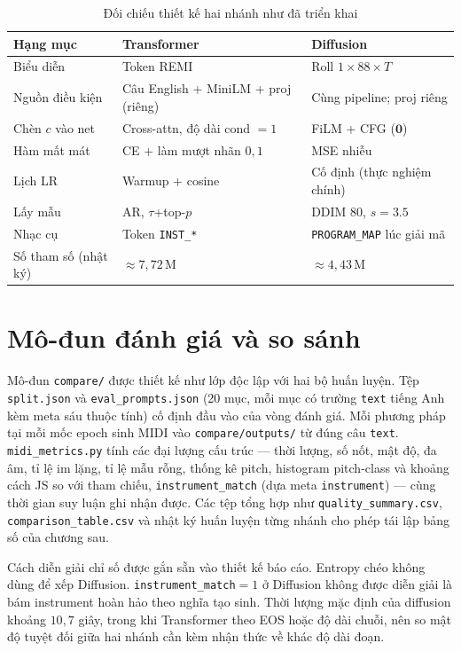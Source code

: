 \begin{table}[htbp]
\centering
\caption{Đối chiếu thiết kế hai nhánh như đã triển khai}
\label{tab:ch3-design}
\small
\begin{tabular}{p{2.8cm}p{5.5cm}p{5.5cm}}
\toprule
\textbf{Hạng mục} & \textbf{Transformer} & \textbf{Diffusion} \\
\midrule
Biểu diễn & Token REMI & Roll $1\times 88\times T$ \\
Nguồn điều kiện & Câu English + MiniLM + proj (riêng) & Cùng pipeline; proj riêng \\
Chèn $c$ vào net & Cross-attn, độ dài cond $=1$ & FiLM + CFG ($\mathbf{0}$) \\
Hàm mất mát & CE + làm mượt nhãn $0{,}1$ & MSE nhiễu \\
Lịch LR & Warmup + cosine & Cố định (thực nghiệm chính) \\
Lấy mẫu & AR, $\tau$+top-$p$ & DDIM 80, $s{=}3.5$ \\
Nhạc cụ & Token \texttt{INST\_*} & \texttt{PROGRAM\_MAP} lúc giải mã \\
Số tham số (nhật ký) & $\approx 7{,}72$\,M & $\approx 4{,}43$\,M \\
\bottomrule
\end{tabular}
\end{table}

\section{Mô-đun đánh giá và so sánh}
\label{sec:ch3-eval}

Mô-đun \texttt{compare/} được thiết kế như lớp độc lập với hai bộ huấn luyện. Tệp \texttt{split.json} và \texttt{eval\_prompts.json} (20 mục, mỗi mục có trường \texttt{text} tiếng Anh kèm meta sáu thuộc tính) cố định đầu vào của vòng đánh giá. Mỗi phương pháp tại mỗi mốc epoch sinh MIDI vào \texttt{compare/outputs/} từ đúng câu \texttt{text}. \texttt{midi\_metrics.py} tính các đại lượng cấu trúc --- thời lượng, số nốt, mật độ, đa âm, tỉ lệ im lặng, tỉ lệ mẫu rỗng, thống kê pitch, histogram pitch-class và khoảng cách JS so với tham chiếu, \texttt{instrument\_match} (dựa meta \texttt{instrument}) --- cùng thời gian suy luận ghi nhận được. Các tệp tổng hợp như \texttt{quality\_summary.csv}, \texttt{comparison\_table.csv} và nhật ký huấn luyện từng nhánh cho phép tái lập bảng số của chương sau.

Cách diễn giải chỉ số được gắn sẵn vào thiết kế báo cáo. Entropy chéo không dùng để xếp Diffusion. \texttt{instrument\_match}${}=1$ ở Diffusion không được diễn giải là bám instrument hoàn hảo theo nghĩa tạo sinh. Thời lượng mặc định của diffusion khoảng $10{,}7$ giây, trong khi Transformer theo EOS hoặc độ dài chuỗi, nên so mật độ tuyệt đối giữa hai nhánh cần kèm nhận thức về khác độ dài đoạn.

